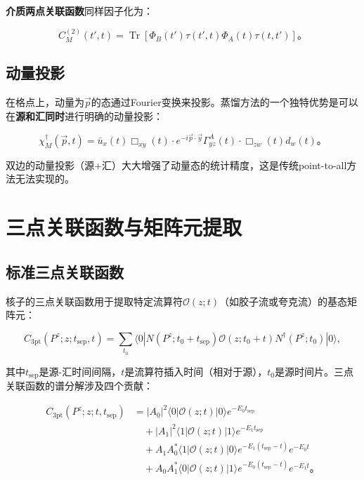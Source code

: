 \documentclass[12pt,a4paper]{ctexart}
\theoremstyle{definition}
\begin{document}
\textbf{介质两点关联函数}\cite{Peardon2009}同样因子化为：

\begin{equation}
C^{(2)}_M(t', t) = \operatorname{Tr}\left[ \Phi_B(t') \tau(t', t) \Phi_A(t) \tau(t, t') \right]。
\label{eq:distilled_meson_2pt}
\end{equation}

\subsection{动量投影}

在格点上，动量为$\vec{p}$的态通过Fourier变换来投影。蒸馏方法的一个独特优势是可以在\textbf{源和汇同时}进行明确的动量投影\cite{Peardon2009,Egerer2021a}：

\begin{equation}
\chi^\dagger_M(\vec{p}, t) = \bar{u}_x(t) \Box_{xy}(t) \cdot e^{-i\vec{p}\cdot\vec{y}} \Gamma^A_{yz}(t) \cdot \Box_{zw}(t) d_w(t)。
\label{eq:momentum_projection}
\end{equation}

双边的动量投影（源+汇）大大增强了动量态的统计精度，这是传统point-to-all方法无法实现的。

\section{三点关联函数与矩阵元提取}

\subsection{标准三点关联函数}

核子的三点关联函数用于提取特定流算符$\mathcal{O}(z; t)$（如胶子流或夸克流）的基态矩阵元\cite{Chen2025gluon}：

\begin{equation}
\boxed{C_{\text{3pt}}(P^z; z; t_{\text{sep}}, t) = \sum_{t_0} \langle 0| N(P^z; t_0 + t_{\text{sep}}) \mathcal{O}(z; t_0 + t) N^\dagger(P^z; t_0) |0\rangle},
\label{eq:3pt_standard}
\end{equation}

其中$t_{\text{sep}}$是源-汇时间间隔，$t$是流算符插入时间（相对于源），$t_0$是源时间片。三点关联函数的谱分解涉及四个贡献\cite{Chen2025gluon}：

\begin{equation}
\begin{aligned}
C_{\text{3pt}}(P^z; z; t, t_{\text{sep}}) &= |A_0|^2 \langle 0|\mathcal{O}(z;t)|0\rangle e^{-E_0 t_{\text{sep}}} \\
&\quad + |A_1|^2 \langle 1|\mathcal{O}(z;t)|1\rangle e^{-E_1 t_{\text{sep}}} \\
&\quad + A_1 A^*_0 \langle 1|\mathcal{O}(z;t)|0\rangle e^{-E_1(t_{\text{sep}}-t)} e^{-E_0 t} \\
&\quad + A_0 A^*_1 \langle 0|\mathcal{O}(z;t)|1\rangle e^{-E_0(t_{\text{sep}}-t)} e^{-E_1 t}。
\end{aligned}
\label{eq:3pt_spectral}
\end{equation}
\end{document}
